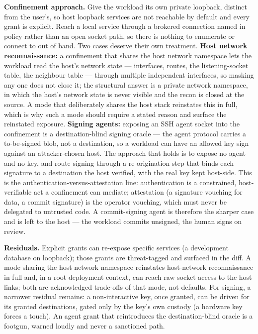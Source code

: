 \textbf{Confinement approach.} Give the workload its own private
loopback, distinct from the user's, so host loopback services are not
reachable by default and every grant is explicit. Reach a local service
through a brokered connection named in policy rather than an open socket
path, so there is nothing to enumerate or connect to out of band. Two
cases deserve their own treatment. \textbf{Host network reconnaissance:}
a confinement that shares the host network namespace lets the workload
read the host's network state --- interfaces, routes, the
listening-socket table, the neighbour table --- through multiple
independent interfaces, so masking any one does not close it; the
structural answer is a private network namespace, in which the host's
network state is never visible and the recon is closed at the source. A
mode that deliberately shares the host stack reinstates this in full,
which is why such a mode should require a stated reason and surface the
reinstated exposure. \textbf{Signing agents:} exposing an SSH agent
socket into the confinement is a destination-blind signing oracle ---
the agent protocol carries a to-be-signed blob, not a destination, so a
workload can have an allowed key sign against an attacker-chosen host.
The approach that holds is to expose no agent and no key, and route
signing through a re-origination step that binds each signature to a
destination the host verified, with the real key kept host-side. This is
the authentication-versus-attestation line: authentication is a
constrained, host-verifiable act a confinement can mediate; attestation
(a signature vouching for data, a commit signature) is the operator
vouching, which must never be delegated to untrusted code. A
commit-signing agent is therefore the sharper case and is left to the
host --- the workload commits unsigned, the human signs on review.

\textbf{Residuals.} Explicit grants can re-expose specific services (a
development database on loopback); those grants are threat-tagged and
surfaced in the diff. A mode sharing the host network namespace
reinstates host-network reconnaissance in full and, in a root deployment
context, can reach raw-socket access to the host links; both are
acknowledged trade-offs of that mode, not defaults. For signing, a
narrower residual remains: a non-interactive key, once granted, can be
driven for its granted destinations, gated only by the key's own custody
(a hardware key forces a touch). An agent grant that reintroduces the
destination-blind oracle is a footgun, warned loudly and never a
sanctioned path.

